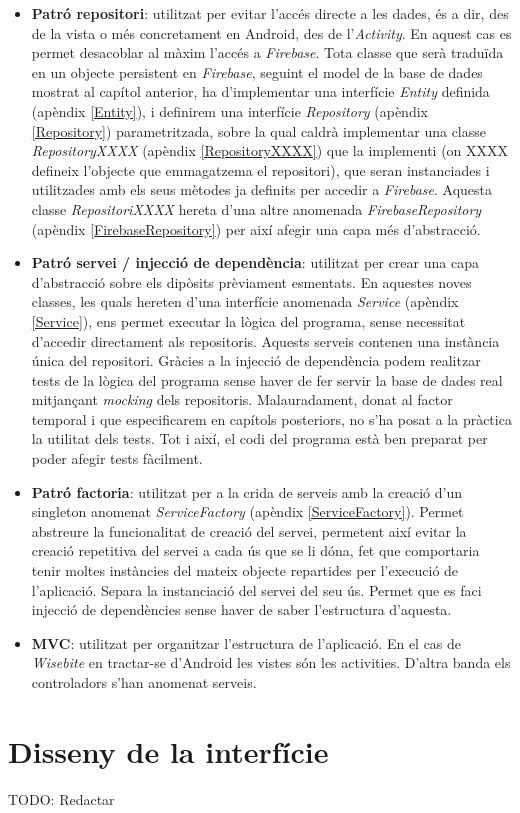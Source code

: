 \begin{itemize}
\item \textbf{Patró repositori}: utilitzat per evitar l'accés directe a les dades, és a dir, des de la vista o més concretament en Android, des de l'\textit{Activity}. En aquest cas es permet desacoblar al màxim l'accés a \textit{Firebase}. Tota classe que serà traduïda en un objecte persistent en \textit{Firebase}, seguint el model de la base de dades mostrat al capítol anterior, ha d'implementar una interfície \textit{Entity} definida (apèndix \ref{Entity}), i definirem una interfície \textit{Repository} (apèndix \ref{Repository}) parametritzada, sobre la qual caldrà implementar una classe \textit{RepositoryXXXX} (apèndix \ref{RepositoryXXXX}) que la implementi (on XXXX defineix l'objecte que emmagatzema el repositori), que seran instanciades i utilitzades amb els seus mètodes ja definits per accedir a \textit{Firebase}. Aquesta classe \textit{RepositoriXXXX} hereta d'una altre anomenada \textit{FirebaseRepository} (apèndix \ref{FirebaseRepository}) per així afegir una capa més d'abstracció.

\item \textbf{Patró servei / injecció de dependència}: utilitzat per crear una capa d'abstracció sobre els dipòsits prèviament esmentats. En aquestes noves classes, les quals hereten d'una interfície anomenada \textit{Service} (apèndix \ref{Service}), ens permet executar la lògica del programa, sense necessitat d'accedir directament als repositoris. Aquests serveis contenen una instància única del repositori. Gràcies a la injecció de dependència podem realitzar tests de la lògica del programa sense haver de fer servir la base de dades real mitjançant \textit{mocking} dels repositoris. Malauradament, donat al factor temporal i que especificarem en capítols posteriors, no s'ha posat a la pràctica la utilitat dels tests. Tot i així, el codi del programa està ben preparat per poder afegir tests fàcilment.

\item \textbf{Patró factoria}: utilitzat per a la crida de serveis amb la creació d'un singleton anomenat \textit{ServiceFactory} (apèndix \ref{ServiceFactory}). Permet abstreure la funcionalitat de creació del servei, permetent així evitar la creació repetitiva del servei a cada ús que se li dóna, fet que comportaria tenir moltes instàncies del mateix objecte repartides per l'execució de l'aplicació. Separa la instanciació del servei del seu ús. Permet que es faci injecció de dependències sense haver de saber l'estructura d'aquesta.

\item \textbf{MVC}: utilitzat per organitzar l'estructura de l'aplicació. En el cas de \textit{Wisebite} en tractar-se d'Android les vistes són les activities. D'altra banda els controladors s'han anomenat serveis.
\end{itemize}


\section{Disseny de la interfície}

TODO: Redactar
